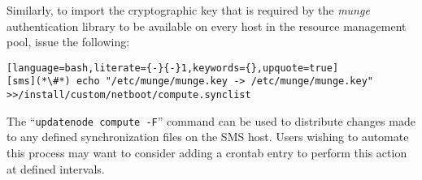 \noindent Similarly, to import the 
cryptographic
key 
that is required by the {\em munge}
authentication library to be available on every host in the resource management
pool, issue the following:

\begin{lstlisting}[language=bash,literate={-}{-}1,keywords={},upquote=true]
[sms](*\#*) echo "/etc/munge/munge.key -> /etc/munge/munge.key" >>/install/custom/netboot/compute.synclist
\end{lstlisting}

\begin{center}
\begin{tcolorbox}[]
\small
The ``\texttt{updatenode compute -F}'' command can be used to distribute changes made to any
defined synchronization files on the SMS host. Users wishing to automate this process may
want to consider adding a crontab entry to perform this action at defined intervals.
\end{tcolorbox}
\end{center}
